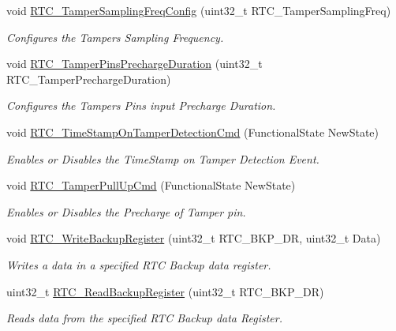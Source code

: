 \begin{DoxyCompactItemize}
void \hyperlink{group___r_t_c_gadc7f33a31df80b5deac313fc8af8d7f7}{R\-T\-C\-\_\-\-Tamper\-Sampling\-Freq\-Config} (uint32\-\_\-t R\-T\-C\-\_\-\-Tamper\-Sampling\-Freq)
\begin{DoxyCompactList}\small\item\em Configures the Tampers Sampling Frequency. \end{DoxyCompactList}\item 
void \hyperlink{group___r_t_c_gafc176a013076a651862dc6a957286025}{R\-T\-C\-\_\-\-Tamper\-Pins\-Precharge\-Duration} (uint32\-\_\-t R\-T\-C\-\_\-\-Tamper\-Precharge\-Duration)
\begin{DoxyCompactList}\small\item\em Configures the Tampers Pins input Precharge Duration. \end{DoxyCompactList}\item 
void \hyperlink{group___r_t_c_ga29c82fceefd21a78dc55ccc5bcc1ed59}{R\-T\-C\-\_\-\-Time\-Stamp\-On\-Tamper\-Detection\-Cmd} (Functional\-State New\-State)
\begin{DoxyCompactList}\small\item\em Enables or Disables the Time\-Stamp on Tamper Detection Event. \end{DoxyCompactList}\item 
void \hyperlink{group___r_t_c_ga981b9c654e521282a2020a81118c8c3c}{R\-T\-C\-\_\-\-Tamper\-Pull\-Up\-Cmd} (Functional\-State New\-State)
\begin{DoxyCompactList}\small\item\em Enables or Disables the Precharge of Tamper pin. \end{DoxyCompactList}\item 
void \hyperlink{group___r_t_c_gaa1241e2b47d04acc116b50d7b031c3aa}{R\-T\-C\-\_\-\-Write\-Backup\-Register} (uint32\-\_\-t R\-T\-C\-\_\-\-B\-K\-P\-\_\-\-D\-R, uint32\-\_\-t Data)
\begin{DoxyCompactList}\small\item\em Writes a data in a specified R\-T\-C Backup data register. \end{DoxyCompactList}\item 
uint32\-\_\-t \hyperlink{group___r_t_c_ga504489fd91a66e392beb82bb8230b37f}{R\-T\-C\-\_\-\-Read\-Backup\-Register} (uint32\-\_\-t R\-T\-C\-\_\-\-B\-K\-P\-\_\-\-D\-R)
\begin{DoxyCompactList}\small\item\em Reads data from the specified R\-T\-C Backup data Register. \end{DoxyCompactList}\item 

\end{DoxyCompactItemize}
